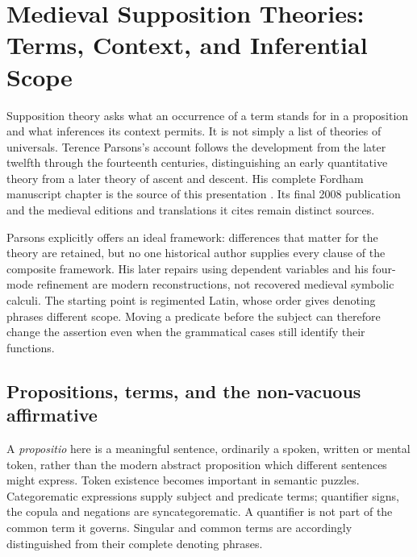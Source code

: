 \chapter{Medieval Supposition Theories: Terms, Context, and Inferential Scope}
\label{sec:p13-medieval-supposition-theories}

Supposition theory asks what an occurrence of a term stands for in a
proposition and what inferences its context permits. It is not simply a
list of theories of universals. Terence Parsons's account follows the
development from the later twelfth through the fourteenth centuries,
distinguishing an early quantitative theory from a later theory of
ascent and descent. His complete Fordham manuscript chapter is the
source of this presentation
\cite[pp.~157--280]{Parsons2007FordhamSupposition}.
Its final 2008 publication and the medieval editions and translations it
cites remain distinct sources.

Parsons explicitly offers an ideal framework: differences that matter
for the theory are retained, but no one historical author supplies every
clause of the composite framework. His later repairs using dependent
variables and his four-mode refinement are modern reconstructions,
not recovered medieval symbolic calculi. The starting point is
regimented Latin, whose order gives denoting phrases different scope.
Moving a predicate before the subject can therefore change the assertion
even when the grammatical cases still identify their functions.

\section{Propositions, terms, and the non-vacuous affirmative}
\label{sec:p13-supposition-core}

A \emph{propositio} here is a meaningful sentence, ordinarily a spoken,
written or mental token, rather than the modern abstract proposition
which different sentences might express. Token existence becomes
important in semantic puzzles. Categorematic expressions supply subject
and predicate terms; quantifier signs, the copula and negations are
syncategorematic. A quantifier is not part of the common term it governs.
Singular and common terms are accordingly distinguished from their
complete denoting phrases.

